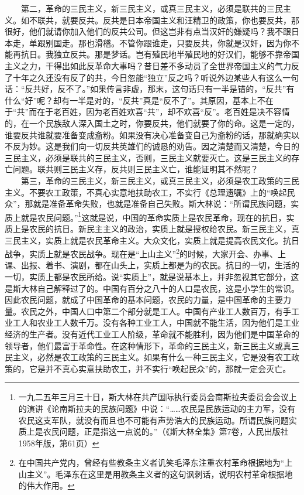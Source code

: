 \documentclass[cn,11pt,chinese]{elegantbook}
\begin{document}
　　第二，革命的三民主义，新三民主义，或真三民主义，必须是联共的三民主义。如不联共，就要反共。反共是日本帝国主义和汪精卫的政策，你也要反共，那很好，他们就请你加入他们的反共公司。但这岂非有点当汉奸的嫌疑吗？我不跟日本走，单跟别国走。那也滑稽。不管你跟谁走，只要反共，你就是汉奸，因为你不能再抗日。我独立反共。那是梦话。岂有殖民地半殖民地的好汉们，能够不靠帝国主义之力，干得出如此反革命大事吗？昔日差不多动员了全世界帝国主义的气力反了十年之久还没有反了的共，今日忽能“独立”反之吗？听说外边某些人有这么一句话：“反共好，反不了。”如果传言非虚，那末，这句话只有一半是错的，“反共”有什么“好”呢？却有一半是对的，“反共”真是“反不了”。其原因，基本上不在于“共”而在于老百姓，因为老百姓欢喜“共”，却不欢喜“反”。老百姓是决不容情的，在一个民族敌人深入国土之时，你要反共，他们就要了你的命。这是一定的，谁要反共谁就要准备变成齑粉。如果没有决心准备变自己为齑粉的话，那就确实以不反为妙。这是我们向一切反共英雄们的诚恳的劝告。因之清楚而又清楚，今日的三民主义，必须是联共的三民主义，否则，三民主义就要灭亡。这是三民主义的存亡问题。联共则三民主义存，反共则三民主义亡，谁能证明其不然呢？\\
　　第三，革命的三民主义，新三民主义，或真三民主义，必须是农工政策的三民主义。不要农工政策，不真心实意地扶助农工，不实行《总理遗嘱》上的“唤起民众”，那就是准备革命失败，也就是准备自己失败。斯大林说：“所谓民族问题，实质上就是农民问题。”\footnote[25]{ 一九二五年三月三十日，斯大林在共产国际执行委员会南斯拉夫委员会会议上的演讲《论南斯拉夫的民族问题》中说：“……农民是民族运动的主力军，没有农民这支军队，就没有而且也不可能有声势浩大的民族运动。所谓民族问题实质上是农民问题，正是指这一点说的。”（《斯大林全集》第7卷，人民出版社1958年版，第61页）}这就是说，中国的革命实质上是农民革命，现在的抗日，实质上是农民的抗日。新民主主义的政治，实质上就是授权给农民。新三民主义，真三民主义，实质上就是农民革命主义。大众文化，实质上就是提高农民文化。抗日战争，实质上就是农民战争。现在是“上山主义”\footnote[26]{ 在中国共产党内，曾经有些教条主义者讥笑毛泽东注重农村革命根据地为“上山主义”。毛泽东在这里是用教条主义者的这句讽刺话，说明农村革命根据地的伟大作用。}的时候，大家开会、办事、上课、出报、着书、演剧，都在山头上，实质上都是为的农民。抗日的一切，生活的一切，实质上都是农民所给。说“实质上”，就是说基本上，并非忽视其它部分，这是斯大林自己解释过了的。中国有百分之八十的人口是农民，这是小学生的常识。因此农民问题，就成了中国革命的基本问题，农民的力量，是中国革命的主要力量。农民之外，中国人口中第二个部分就是工人。中国有产业工人数百万，有手工业工人和农业工人数千万。没有各种工业工人，中国就不能生活，因为他们是工业经济的生产者。没有近代工业工人阶级，革命就不能胜利，因为他们是中国革命的领导者，他们最富于革命性。在这种情形下，革命的三民主义，新三民主义或真三民主义，必然是农工政策的三民主义。如果有什么一种三民主义，它是没有农工政策的，它是并不真心实意扶助农工，并不实行“唤起民众”的，那就一定会灭亡。\\
\end{document}
